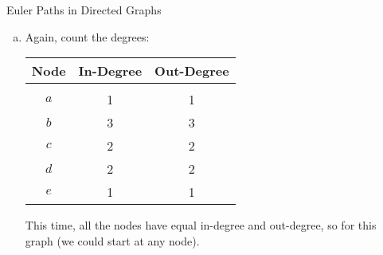 \begin{example}[https://www.youtube.com/watch?v=2N7o_CWptpM&list=PLfmpjsIzhztst_PxJXo574wshSwxU9Yg_&index=6]{Euler Paths in Directed Graphs}
\begin{enumerate}[(a)]
\item Again, count the degrees:
\begin{center}
\begin{tabular}{c c c}
\textbf{Node} & \textbf{In-Degree} & \textbf{Out-Degree}\\
\hline
 & & \\
$a$ & 1 & 1\\
$b$ & 3 & 3\\
$c$ & 2 & 2\\
$d$ & 2 & 2\\
$e$ & 1 & 1
\end{tabular}
\end{center}
This time, all the nodes have equal in-degree and out-degree, so  for this graph (we could start at any node).
\end{enumerate}
\end{example}
\vfill
\pagebreak

